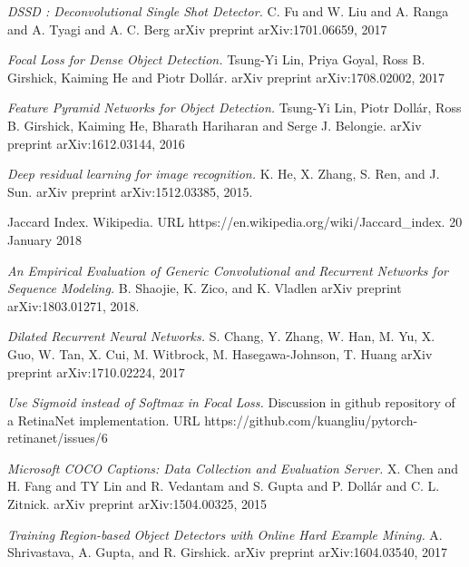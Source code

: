 \documentclass[a4paper, twoside]{article}
\begin{document}
\begin{thebibliography}{99}
    
    
	\textit{{DSSD} : Deconvolutional Single Shot Detector.}
	C. Fu and
               W. Liu and
               A. Ranga and
               A. Tyagi and
               A. C. Berg
    arXiv preprint arXiv:1701.06659, 2017
    
    
    
	\textit{Focal Loss for Dense Object Detection.}
	Tsung{-}Yi Lin,
    Priya Goyal,
    Ross B. Girshick,
    Kaiming He and
    Piotr Doll{\'{a}}r.
    arXiv preprint arXiv:1708.02002, 2017

	\textit{Feature Pyramid Networks for Object Detection.}
	Tsung{-}Yi Lin,
               Piotr Doll{\'{a}}r,
               Ross B. Girshick,
               Kaiming He,
               Bharath Hariharan and
               Serge J. Belongie.
    arXiv preprint arXiv:1612.03144, 2016
    

	\textit{Deep residual learning for image recognition.}
    K. He, X. Zhang, S. Ren, and J. Sun. 
    arXiv preprint arXiv:1512.03385, 2015.

    
	Jaccard Index. Wikipedia.
    URL https://en.wikipedia.org/wiki/Jaccard{\_}index. 
    20 January 2018





	\textit{An Empirical Evaluation of Generic Convolutional and Recurrent Networks for Sequence Modeling.}
	B. Shaojie, K. Zico, and K. Vladlen
    arXiv preprint arXiv:1803.01271, 2018.
    
	\textit{Dilated Recurrent Neural Networks.}
	S. Chang, Y. Zhang, W. Han, M. Yu, X. Guo, W. Tan, X. Cui, M. Witbrock, M. Hasegawa-Johnson, T. Huang
	arXiv preprint arXiv:1710.02224, 2017
	
	
\textit{Use Sigmoid instead of Softmax in Focal Loss.}
Discussion in github repository of a RetinaNet implementation.
URL https://github.com/kuangliu/pytorch-retinanet/issues/6


	\textit{Microsoft COCO Captions: Data Collection and Evaluation Server.}
	X. Chen and H. Fang and TY Lin and R. Vedantam and S. Gupta and P. Dollár and C. L. Zitnick. 
	arXiv preprint arXiv:1504.00325, 2015

	\textit{Training Region-based Object Detectors with Online Hard Example Mining.}
	A. Shrivastava, A. Gupta, and R. Girshick. 
	arXiv preprint arXiv:1604.03540, 2017




\end{thebibliography}
\end{document}

